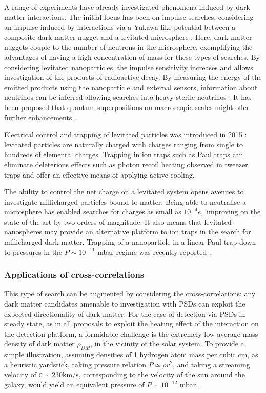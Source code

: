 \documentclass[twocolumn,english,notitlepage,superscriptaddress,nofootinbib]{revtex4-2}
\begin{document}
A range of experiments have already investigated  phenomena induced by dark matter interactions. The initial focus has been on impulse searches,  considering an impulse induced by interactions via a Yukawa-like potential between a composite dark matter nugget and a levitated microsphere  \cite{dark_matter_3}.  Here,  dark matter nuggets couple to the number of neutrons in the microsphere, exemplifying the advantages of having a high concentration of mass for these types of searches.  By considering levitated nanoparticles,  the impulse sensitivity increases and allows  investigation of the products of radioactive decay.  By measuring the energy of the emitted products using the nanoparticle and external sensors, information about neutrinos can be inferred allowing searches into heavy sterile neutrinos \cite{Carney2023}.  It has been proposed that  quantum superpositions on  macroscopic scales might offer further enhancements \cite{Killian2023}.



Electrical control and trapping of levitated particles was introduced in 2015 \cite{Millen2015,fonseca2016nonlinear}: levitated particles are naturally charged with charges ranging from single to hundreds of elemental charges.  Trapping in ion traps such as Paul traps  \cite{Millen2015} can eliminate deleterious effects such as photon recoil heating observed in tweezer traps and offer an effective means of applying active cooling.  

The ability to control the net charge on a levitated system opens avenues to investigate millicharged particles bound to matter. 
Being able to neutralise a microsphere has enabled searches for charges as small as $10^{-4} e,$ \cite{Millicharges2021} improving on the state of the art by two orders of magnitude.  It also means that levitated nanospheres may provide an alternative platform to ion traps \cite{MilliCharges2023} in the search for millicharged dark matter.  Trapping of a nanoparticle in a linear Paul trap down to pressures in the $P\sim 10^{-11}$ mbar regime was recently reported  \cite{Northrup2023}. 

\subsubsection{Applications of cross-correlations}

This type of search can be augmented by considering the cross-correlations: any dark matter candidates amenable to investigation with PSDs 
can exploit the expected directionality of dark matter.  For the case of detection via PSDs in steady state, as in all proposals to exploit the heating effect of the interaction on the detection platform,  a formidable challenge is the extremely low average  mass density of dark matter $\rho_{DM}$, in the vicinity of the solar system. To provide a simple illustration, assuming
densities of 1 hydrogen atom mass per cubic cm, as a heuristic yardstick, taking pressure relation $P \simeq \rho \bar{v}^2$, and taking a streaming velocity of $ \bar{v} \sim 230 \textrm{km/s}$, corresponding to the velocity of the sun around the galaxy, would yield
an equivalent pressure of $P\sim 10^{-12}$ mbar.  
\end{document}
